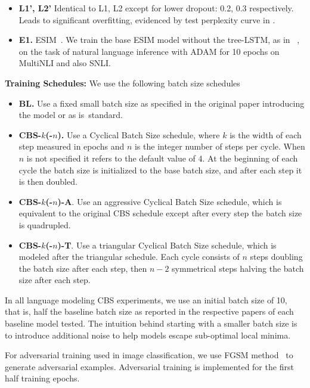 \begin{itemize}[noitemsep,topsep=0pt,parsep=0pt,partopsep=0pt,leftmargin=*]
\item \textbf{L1', L2'} Identical to L1, L2 except for lower dropout: 0.2, 0.3 respectively. Leads to significant overfitting, evidenced by test perplexity curve in .

\item \textbf{E1.} ESIM~\citep{chen2017enhanced}. We train the base ESIM model without the tree-LSTM, as in ~\citep{N18-1101}, on the task of natural language inference with ADAM for 10 epochs on MultiNLI and also SNLI.
\end{itemize}

\textbf{Training Schedules:}
We use the following batch size schedules
\begin{itemize}[noitemsep,topsep=0pt,parsep=0pt,partopsep=0pt,leftmargin=*]
\item \textbf{BL.} Use a fixed small batch size as specified in the original paper introducing the model or as is~standard. 
\item \textbf{CBS-$k$(-$n$).} Use a Cyclical Batch Size schedule, where $k$ is the width of each step measured in epochs and $n$ is the integer number of steps per cycle. When $n$ is not specified it refers to the default value of 4. At the beginning of each cycle the batch size is initialized to the base batch size, and after each step it is then doubled.
\item \textbf{CBS-$k$(-$n$)-A}. Use an aggressive Cyclical Batch Size schedule, which is equivalent to the original CBS schedule except after every step the batch size is quadrupled.
\item \textbf{CBS-$k$(-$n$)-T}. Use a triangular Cyclical Batch Size schedule, which is modeled after the triangular schedule. Each cycle consists of $n$ steps doubling the batch size after each step, then $n-2$ symmetrical steps halving the batch size after each step.
\end{itemize}

In all language modeling CBS experiments, we use an initial batch size of 10, that is, 
half the baseline batch size as reported in the respective papers of each baseline
model tested. The intuition behind starting with a smaller batch size is to introduce 
additional noise to help models escape sub-optimal local minima. 

For adversarial training used in image classification, we use FGSM method~\cite{goodfellow6572explaining} to generate adversarial examples. Adversarial training is implemented for the first half training epochs.

